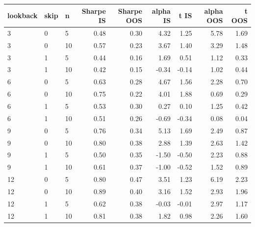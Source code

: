\begin{tabular}{lllrrrrrr}
\toprule
lookback & skip & n & Sharpe IS & Sharpe OOS & alpha IS & t IS & alpha OOS & t OOS \\
\midrule
3 & 0 & 5 & 0.48 & 0.30 & 4.32 & 1.25 & 5.78 & 1.69 \\
3 & 0 & 10 & 0.57 & 0.23 & 3.67 & 1.40 & 3.29 & 1.48 \\
3 & 1 & 5 & 0.44 & 0.16 & 1.69 & 0.51 & 1.12 & 0.33 \\
3 & 1 & 10 & 0.42 & 0.15 & -0.34 & -0.14 & 1.02 & 0.44 \\
6 & 0 & 5 & 0.63 & 0.28 & 4.67 & 1.56 & 2.28 & 0.70 \\
6 & 0 & 10 & 0.75 & 0.22 & 4.01 & 1.88 & 0.69 & 0.29 \\
6 & 1 & 5 & 0.53 & 0.30 & 0.27 & 0.10 & 1.25 & 0.42 \\
6 & 1 & 10 & 0.51 & 0.26 & -0.69 & -0.34 & 0.08 & 0.04 \\
9 & 0 & 5 & 0.76 & 0.34 & 5.13 & 1.69 & 2.49 & 0.87 \\
9 & 0 & 10 & 0.80 & 0.38 & 2.88 & 1.39 & 2.63 & 1.42 \\
9 & 1 & 5 & 0.50 & 0.35 & -1.50 & -0.50 & 2.23 & 0.88 \\
9 & 1 & 10 & 0.61 & 0.37 & -1.00 & -0.52 & 1.52 & 0.89 \\
12 & 0 & 5 & 0.80 & 0.47 & 3.51 & 1.23 & 6.19 & 2.23 \\
12 & 0 & 10 & 0.89 & 0.40 & 3.16 & 1.52 & 2.93 & 1.96 \\
12 & 1 & 5 & 0.62 & 0.38 & -0.03 & -0.01 & 2.97 & 1.17 \\
12 & 1 & 10 & 0.81 & 0.38 & 1.82 & 0.98 & 2.26 & 1.60 \\
\bottomrule
\end{tabular}
